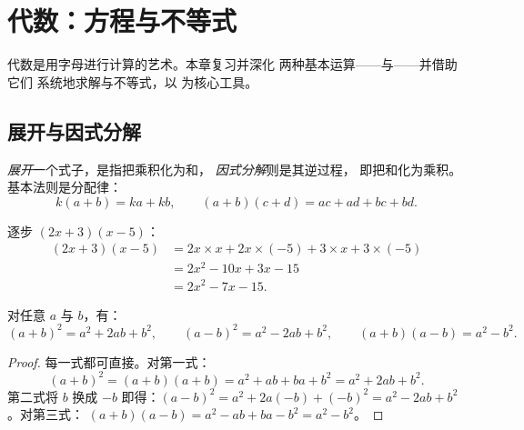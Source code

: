 \chapter{代数：方程与不等式}\label{ch:g10:algebra}

代数是用字母进行计算的艺术。本章复习并深化
两种基本运算——与——并借助它们
系统地求解与不等式，以
为核心工具。

\section{展开与因式分解}

\begin{definition}[展开、因式分解]\label{def:g10:algebra:expand}
\emph{展开}一个式子，是指把乘积化为和，
\emph{因式分解}则是其逆过程，
即把和化为乘积。基本法则是分配律：
\[
k(a + b) = ka + kb,
\qquad
(a + b)(c + d) = ac + ad + bc + bd .
\]
\end{definition}

\begin{example}\label{ex:g10:algebra:expand}
逐步 $(2x + 3)(x - 5)$：
\begin{align*}
(2x + 3)(x - 5)
&= 2x \times x + 2x \times (-5) + 3 \times x + 3 \times (-5) \\
&= 2x^2 - 10x + 3x - 15 \\
&= 2x^2 - 7x - 15 .
\end{align*}
\end{example}

\begin{theorem}[乘法公式]\label{thm:g10:algebra:identities}
对任意 $a$ 与 $b$，有：
\[
(a+b)^2 = a^2 + 2ab + b^2,
\qquad
(a-b)^2 = a^2 - 2ab + b^2,
\qquad
(a+b)(a-b) = a^2 - b^2 .
\]
\end{theorem}

\begin{proof}
每一式都可直接。对第一式：
\[
(a+b)^2 = (a+b)(a+b) = a^2 + ab + ba + b^2 = a^2 + 2ab + b^2 .
\]
第二式将 $b$ 换成 $-b$ 即得：$(a-b)^2 = a^2 + 2a(-b) +
(-b)^2 = a^2 - 2ab + b^2$。对第三式：
$(a+b)(a-b) = a^2 - ab + ba - b^2 = a^2 - b^2$。
\end{proof}

